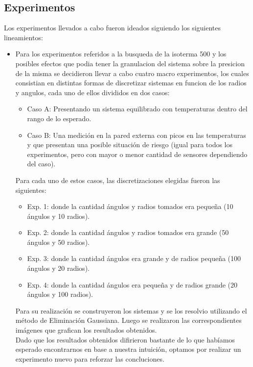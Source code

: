 \documentclass[12pt,a4paper]{article}
\begin{document}
\subsection{Experimentos}    
%
Los experimentos llevados a cabo fueron ideados siguiendo los siguientes lineamientos:
\begin{itemize}
	\item Para los experimentos referidos a la busqueda de la isoterma 500 y los posibles efectos que podia tener la granulacion del sistema sobre la presicion de la misma se decidieron llevar a cabo cuatro macro experimentos, los cuales consistian en distintas formas de discretizar sistemas en funcion de los radios y angulos, cada uno de ellos divididos en dos casos:
\begin{itemize}
\item Caso A: Presentando un sistema equilibrado con temperaturas dentro del rango de lo esperado.
\item Caso B: Una medición en la pared externa con picos en las temperaturas y que presentan una posible situación de riesgo (igual para todos los experimentos, pero con mayor o menor cantidad de sensores dependiendo del caso).
	\end{itemize}

	Para cada uno de estos casos, las discretizaciones elegidas fueron las siguientes: 
    \begin{itemize}
		\item Exp. 1: donde la cantidad ángulos y radios tomados era pequeña (10 ángulos y 10 radios).
        \item Exp. 2: donde la cantidad ángulos y radios tomados era grande (50 ángulos y 50 radios).
        \item Exp. 3: donde la cantidad ángulos era grande y de radios pequeña (100 ángulos y 20 radios).
        \item Exp. 4: donde la cantidad ángulos era pequeña y de radios grande (20 ángulos y 100 radios).
	\end{itemize}

    Para su realización se construyeron los sistemas y se los resolvio utilizando el método de Eliminación Gaussiana. Luego se realizaron las correspondientes imágenes que grafican los resultados obtenidos.  \\
    
    Dado que los resultados obtenidos difirieron bastante de lo que habíamos esperado encontrarnos en base a nuestra intuición, optamos por realizar un experimento nuevo para reforzar las concluciones. \\
    

\end{itemize}
\end{document}
